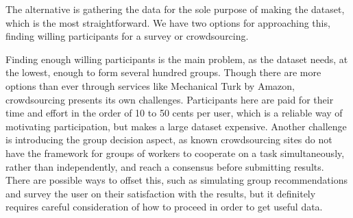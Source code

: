 The alternative is gathering the data for the sole purpose of making the dataset, which is the most straightforward. We have two options for approaching this, finding willing participants for a survey or crowdsourcing.

Finding enough willing participants is the main problem, as the dataset needs, at the lowest, enough to form several hundred groups. Though there are more options than ever through services like Mechanical Turk by Amazon, crowdsourcing presents its own challenges. Participants here are paid for their time and effort in the order of 10 to 50 cents per user, which is a reliable way of motivating participation, but makes a large dataset expensive. Another challenge is introducing the group decision aspect, as known crowdsourcing sites do not have the framework for groups of workers to cooperate on a task simultaneously, rather than independently, and reach a consensus before submitting results. There are possible ways to offset this, such as simulating group recommendations and survey the user on their satisfaction with the results, but it definitely requires careful consideration of how to proceed in order to get useful data.

